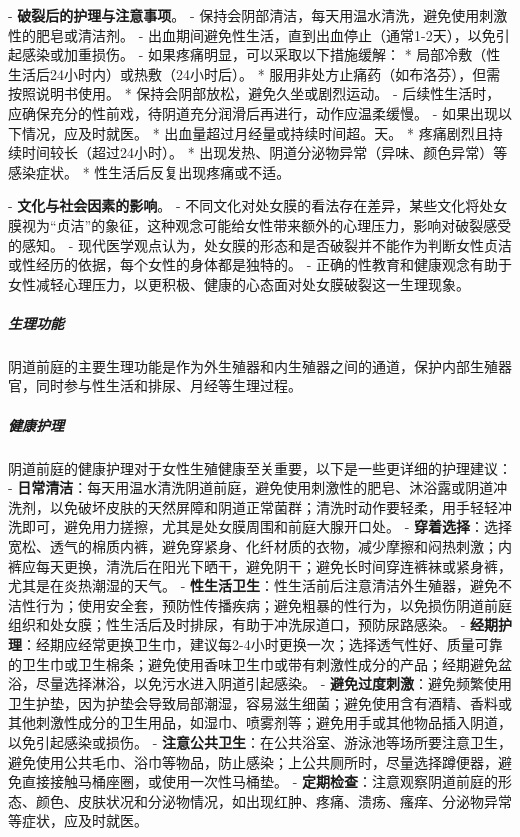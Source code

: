 \begin{enumerate}
  - \textbf{破裂后的护理与注意事项}。
    - 保持会阴部清洁，每天用温水清洗，避免使用刺激性的肥皂或清洁剂。
    - 出血期间避免性生活，直到出血停止（通常1-2天），以免引起感染或加重损伤。
    - 如果疼痛明显，可以采取以下措施缓解：
      * 局部冷敷（性生活后24小时内）或热敷（24小时后）。
      * 服用非处方止痛药（如布洛芬），但需按照说明书使用。
      * 保持会阴部放松，避免久坐或剧烈运动。
    - 后续性生活时，应确保充分的性前戏，待阴道充分润滑后再进行，动作应温柔缓慢。
    - 如果出现以下情况，应及时就医。
      * 出血量超过月经量或持续时间超。天。
      * 疼痛剧烈且持续时间较长（超过24小时）。
      * 出现发热、阴道分泌物异常（异味、颜色异常）等感染症状。
      * 性生活后反复出现疼痛或不适。

  - \textbf{文化与社会因素的影响}。
    - 不同文化对处女膜的看法存在差异，某些文化将处女膜视为“贞洁”的象征，这种观念可能给女性带来额外的心理压力，影响对破裂感受的感知。
    - 现代医学观点认为，处女膜的形态和是否破裂并不能作为判断女性贞洁或性经历的依据，每个女性的身体都是独特的。
    - 正确的性教育和健康观念有助于女性减轻心理压力，以更积极、健康的心态面对处女膜破裂这一生理现象。

\subparagraph{生理功能}
阴道前庭的主要生理功能是作为外生殖器和内生殖器之间的通道，保护内部生殖器官，同时参与性生活和排尿、月经等生理过程。

\subparagraph{健康护理}
阴道前庭的健康护理对于女性生殖健康至关重要，以下是一些更详细的护理建议：
- \textbf{日常清洁}：每天用温水清洗阴道前庭，避免使用刺激性的肥皂、沐浴露或阴道冲洗剂，以免破坏皮肤的天然屏障和阴道正常菌群；清洗时动作要轻柔，用手轻轻冲洗即可，避免用力搓擦，尤其是处女膜周围和前庭大腺开口处。
- \textbf{穿着选择}：选择宽松、透气的棉质内裤，避免穿紧身、化纤材质的衣物，减少摩擦和闷热刺激；内裤应每天更换，清洗后在阳光下晒干，避免阴干；避免长时间穿连裤袜或紧身裤，尤其是在炎热潮湿的天气。
- \textbf{性生活卫生}：性生活前后注意清洁外生殖器，避免不洁性行为；使用安全套，预防性传播疾病；避免粗暴的性行为，以免损伤阴道前庭组织和处女膜；性生活后及时排尿，有助于冲洗尿道口，预防尿路感染。
- \textbf{经期护理}：经期应经常更换卫生巾，建议每2-4小时更换一次；选择透气性好、质量可靠的卫生巾或卫生棉条；避免使用香味卫生巾或带有刺激性成分的产品；经期避免盆浴，尽量选择淋浴，以免污水进入阴道引起感染。
- \textbf{避免过度刺激}：避免频繁使用卫生护垫，因为护垫会导致局部潮湿，容易滋生细菌；避免使用含有酒精、香料或其他刺激性成分的卫生用品，如湿巾、喷雾剂等；避免用手或其他物品插入阴道，以免引起感染或损伤。
- \textbf{注意公共卫生}：在公共浴室、游泳池等场所要注意卫生，避免使用公共毛巾、浴巾等物品，防止感染；上公共厕所时，尽量选择蹲便器，避免直接接触马桶座圈，或使用一次性马桶垫。
- \textbf{定期检查}：注意观察阴道前庭的形态、颜色、皮肤状况和分泌物情况，如出现红肿、疼痛、溃疡、瘙痒、分泌物异常等症状，应及时就医。


\end{enumerate}

